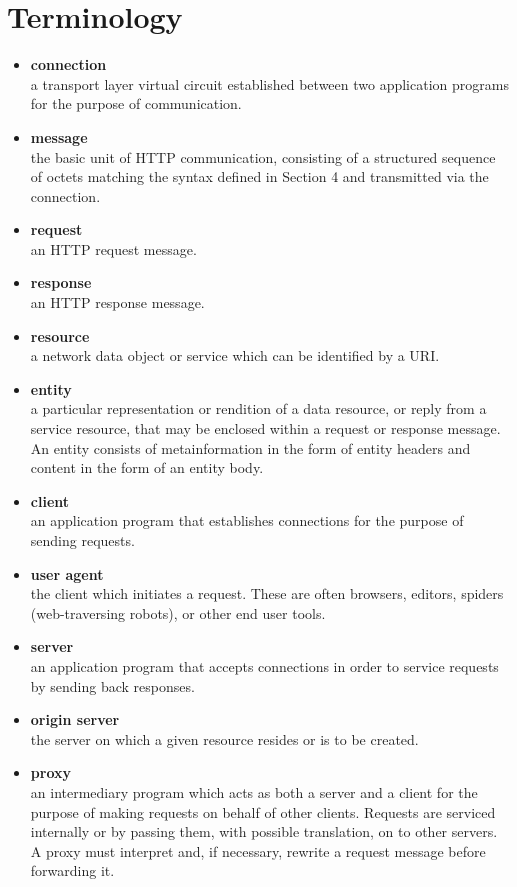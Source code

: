 \section{Terminology}
\begin{itemize}
\item{\textbf{connection}\\
a transport layer virtual circuit established between two application programs for the purpose of communication.}
\item{\textbf{message}\\
the basic unit of HTTP communication, consisting of a structured sequence of octets matching the syntax defined in Section 4 and transmitted via the connection.}
\item{\textbf{request}\\
an HTTP request message.
}
\item{\textbf{response}\\
an HTTP response message.}
\item{\textbf{resource}\\
a network data object or service which can be identified by a URI.}
\item{\textbf{entity}\\
a particular representation or rendition of a data resource, or reply from a service resource, that may be enclosed within a request or response message. An entity consists of metainformation in the form of entity headers and content in the form of an entity body.}
\item{\textbf{client}\\
an application program that establishes connections for the purpose of sending requests.}
\item{\textbf{user agent}\\
the client which initiates a request. These are often browsers, editors, spiders (web-traversing robots), or other end user tools.}
\item{\textbf{server}\\
an application program that accepts connections in order to service requests by sending back responses.}
\item{\textbf{origin server}\\
the server on which a given resource resides or is to be created.}
\item{\textbf{proxy}\\
an intermediary program which acts as both a server and a client for the purpose of making requests on behalf of other clients. Requests are serviced internally or by passing them, with possible translation, on to other servers. A proxy must interpret and, if necessary, rewrite a request message before forwarding it.\\
}
\end{itemize}
